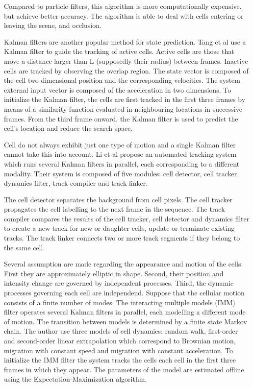 \documentclass[12pt,a4paper,openany]{book}
\begin{document}
Compared to particle filters, this algorithm is more computationally expensive, but achieve better accuracy. The algorithm is able to deal with cells entering or leaving the scene, and occlusion.

Kalman filters are another popular method for state prediction. Tang et al \cite{tang} use a Kalman filter to guide the tracking of active cells. Active cells are those that move a distance larger than L (supposedly their radius) between frames. Inactive cells are tracked by observing the overlap region. The state vector is composed of the cell two dimensional position and the corresponding velocities. The system external input vector is composed of the acceleration in two dimensions. To initialize the Kalman filter, the cells are first tracked in the first three frames by means of a similarity function evaluated in neighbouring locations in successive frames. From the third frame onward, the Kalman filter is used to predict the cell's location and reduce the search space.

Cell do not always exhibit just one type of motion and a single Kalman filter cannot take this into account. Li et al \cite{li07} propose an automated tracking system which runs several Kalman filters in parallel, each corresponding to a different modality. Their system is composed of five modules: cell detector, cell tracker, dynamics filter, track compiler and track linker.

The cell detector separates the background from cell pixels. The cell tracker propagates the cell labelling to the next frame in the sequence. The track compiler compares the results of the cell tracker, cell detector and dynamics filter to create a new track for new or daughter cells, update or terminate existing tracks. The track linker connects two or more track segments if they belong to the same cell. 

Several assumption are made regarding the appearance and motion of the cells. First they are approximately elliptic in shape. Second, their position and intensity change are governed by independent processes. Third, the dynamic processes governing each cell are independend. Suppose that the cellular motion consists of a finite number of modes. The interacting multiple models (IMM) filter operates several Kalman filters in parallel, each modelling a different mode of motion. The transition between models is determined by a finite state Markov chain. The author use three models of cell dynamics: random walk, first-order and second-order linear extrapolation which correspond to Brownian motion, migration with constant speed and migration with constant acceleration. To initialize the IMM filter the system tracks the cells each cell in the first three frames in which they appear. The parameters of the model are estimated offline using the Expectation-Maximization algorithm.
\end{document}
